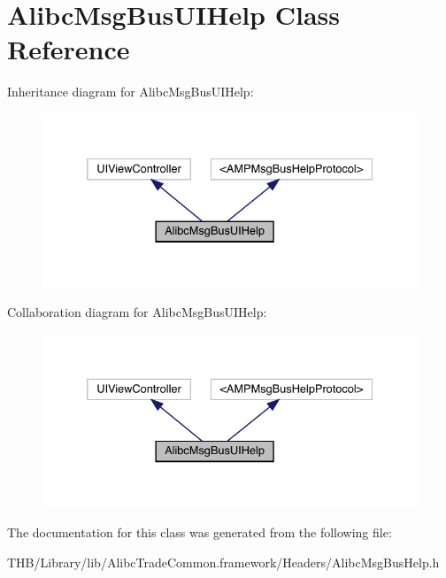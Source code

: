 \hypertarget{interface_alibc_msg_bus_u_i_help}{}\section{Alibc\+Msg\+Bus\+U\+I\+Help Class Reference}
\label{interface_alibc_msg_bus_u_i_help}


Inheritance diagram for Alibc\+Msg\+Bus\+U\+I\+Help\+:\nopagebreak
\begin{figure}[H]
\begin{center}
\leavevmode
\includegraphics[width=332pt]{interface_alibc_msg_bus_u_i_help__inherit__graph}
\end{center}
\end{figure}


Collaboration diagram for Alibc\+Msg\+Bus\+U\+I\+Help\+:\nopagebreak
\begin{figure}[H]
\begin{center}
\leavevmode
\includegraphics[width=332pt]{interface_alibc_msg_bus_u_i_help__coll__graph}
\end{center}
\end{figure}


The documentation for this class was generated from the following file\+:\begin{DoxyCompactItemize}
\item 
T\+H\+B/\+Library/lib/\+Alibc\+Trade\+Common.\+framework/\+Headers/Alibc\+Msg\+Bus\+Help.\+h\end{DoxyCompactItemize}
